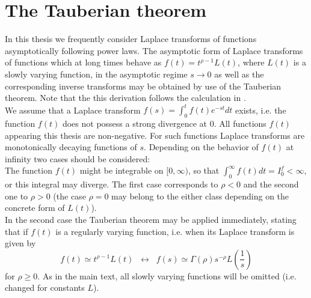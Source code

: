\chapter{The Tauberian theorem} \label{sec:tauberian}

In this thesis we frequently consider Laplace transforms of functions asymptotically following power laws. The asymptotic form of Laplace transforms of functions which at long times behave as $f(t) = t^{\rho-1} L(t)$, where $L(t)$ is a slowly varying function, in the asymptotic regime $s \to 0$ as well as the corresponding inverse transforms may be obtained by use of the Tauberian theorem. Note that the this derivation follows the calculation in \cite{bothe}.\\

We assume that a Laplace transform $f(s) = \int_0^t f(t) e^{-st} dt$ exists, i.e. the function $f(t)$ does not possess a strong divergence at 0. All functions $f(t)$ appearing this thesis are non-negative. For such functions Laplace transforms are monotonically decaying functions of $s$. Depending on the behavior of $f(t)$ at infinity two cases should be considered: \\
The function $f(t)$ might be integrable on $[0, \infty)$, so that 
$\int_0^\infty f(t) dt = I_0^{f} < \infty$, or this integral may diverge. The first case corresponds to $\rho < 0$ and 
the second one to $\rho > 0$ (the case $\rho = 0$ may belong to the either class depending on the concrete form of $L(t)$). \\
In the second case the Tauberian theorem may be applied immediately, stating that if $f(t)$ is a regularly varying function, i.e. when  its Laplace transform is given by 
\begin{equation}
 f(t) \simeq t^{\rho-1} L(t) \;\; \leftrightarrow \;\; f(s) \simeq \Gamma(\rho) s^{-\rho} L\left(\frac{1}{s}\right)
 \label{eq:Tauberian}
\end{equation}
for $\rho \geq 0$. As in the main text, all slowly varying functions will be omitted (i.e. changed for constants $L$). 


